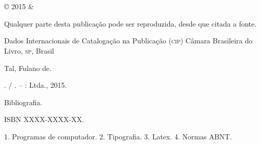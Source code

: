 \begin{titlingpage}

\phantom{xxx}
\vspace{0.5cm}
\huge
\raggedright
\imprimirautor\\
\vspace{2.5cm}
\huge 
{\raggedleft
\textit{\textcolor{blue}{\imprimirtitulo}}\\[1cm]
}
\centering 
\vfill
\Large
\imprimirinstituicao

\clearpage
\ABNTEXfontereduzida
© 2015 \imprimirautor \space \& \imprimirinstituicao

Qualquer parte desta publicação pode ser reproduzida, desde que citada a fonte.

\vspace*{\fill}

\begin{center}
Dados Internacionais de Catalogação na Publicação (\textsc{cip})
Câmara Brasileira do Livro, \textsc{sp}, Brasil
\end{center}

\begin{mdframed}
\noindent Tal, Fulano de.

\imprimirtitulo. / \imprimirautor. -- \imprimirlocal: \imprimirinstituicao
Ltda., 2015.

\medskip

Bibliografia.

ISBN XXXX-XXXX-XX.

\medskip

1. Programas de computador. 2. Tipografia. 3. Latex. 4. Normas ABNT.

\end{mdframed}

\end{titlingpage}